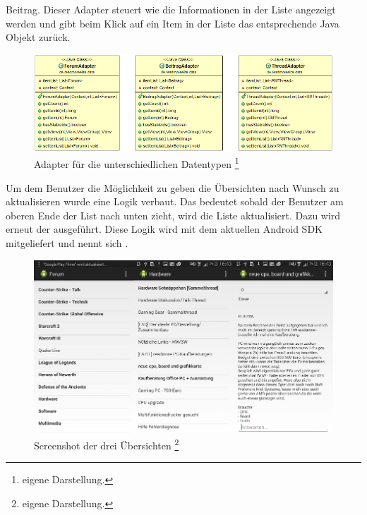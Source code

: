 Beitrag. Dieser Adapter steuert wie die Informationen in der Liste angezeigt
werden und gibt beim Klick auf ein Item in der Liste das entsprechende Java
Objekt zurück.
\begin{figure}[!htbp]
\centering
\includegraphics[width=\textwidth]{Bilder/adapter.png}
\caption[Adapter für die unterschiedlichen Datentypen]{Adapter für die unterschiedlichen Datentypen
\protect\footnote{eigene Darstellung.} }
\label{restuml}
\end{figure}
Um dem Benutzer die Möglichkeit zu geben die Übersichten nach Wunsch zu
aktualisieren wurde eine  Logik verbaut. Das bedeutet
sobald der Benutzer am oberen Ende der List nach unten zieht, wird die Liste
aktualisiert. Dazu wird erneut der  ausgeführt. Diese
 Logik wird mit dem aktuellen Android SDK
mitgeliefert und nennt sich . 
\begin{figure}[!htbp]
\centering
\includegraphics[width=\textwidth]{Bilder/screen_gesamt.png}
\caption[Screenshot der drei Übersichten]{Screenshot der drei Übersichten \protect\footnote{eigene Darstellung.} }
\label{restuml}
\end{figure}
